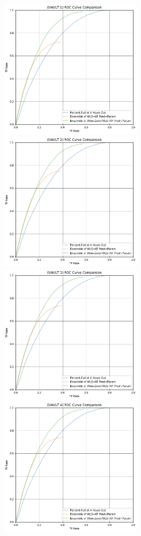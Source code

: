 \begin{figure}[h]
\centering
\includegraphics[width=7cm]{body/results/Graphs/JustSeries/2.PerformanceofEnsemble/4.Combine/Compare/v1.png}
\includegraphics[width=7cm]{body/results/Graphs/JustSeries/2.PerformanceofEnsemble/4.Combine/Compare/v2.png}
\includegraphics[width=7cm]{body/results/Graphs/JustSeries/2.PerformanceofEnsemble/4.Combine/Compare/v3.png}
\includegraphics[width=7cm]{body/results/Graphs/JustSeries/2.PerformanceofEnsemble/4.Combine/Compare/v4.png}

\end{figure}
